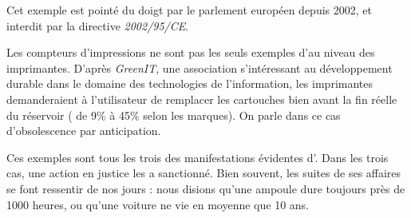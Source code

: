 Cet exemple est pointé du doigt par le parlement européen depuis 2002, et interdit par la directive \textit{2002/95/CE}. 
\smallbreak

Les compteurs d'impressions ne sont pas les seuls exemples d'\op au niveau des imprimantes. D'après \textit{GreenIT}\cite{greenit_cartouche_encre}, une association s'intéressant au développement durable  dans le domaine des  technologies de l'information, les imprimantes demanderaient à l'utilisateur de remplacer les cartouches bien avant la fin réelle du réservoir ( de 9\% à 45\% selon les marques). On parle dans ce cas d'obsolescence par anticipation.


\medbreak

Ces exemples sont tous les trois des manifestations évidentes d'\op. Dans les trois cas, une action en justice les a sanctionné. Bien souvent, les suites de ses affaires se font ressentir de nos jours : nous disions qu'une ampoule dure toujours près de 1000 heures, ou qu'une voiture ne vie en moyenne que 10 ans. 
